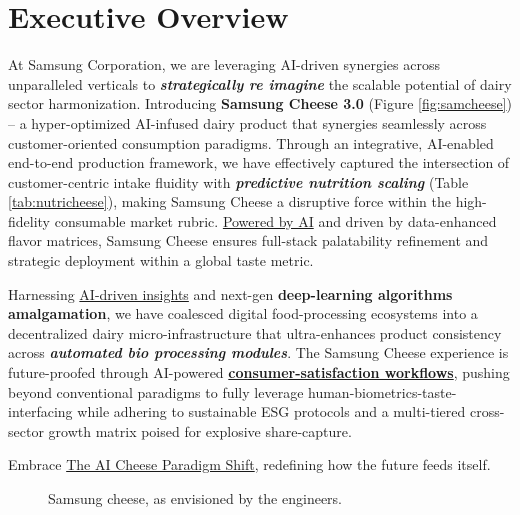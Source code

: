 \section*{Executive Overview}
At Samsung Corporation, we are leveraging AI-driven synergies across unparalleled verticals to \textit{\textbf{strategically re imagine}} the scalable potential of dairy sector harmonization. Introducing \textbf{Samsung Cheese 3.0} (Figure \ref{fig:samcheese}) – a hyper-optimized AI-infused dairy product that synergies seamlessly across customer-oriented consumption paradigms. Through an integrative, AI-enabled end-to-end production framework, we have effectively captured the intersection of customer-centric intake fluidity with \textit{\textbf{predictive nutrition scaling}} (Table \ref{tab:nutricheese}), making Samsung Cheese a disruptive force within the high-fidelity consumable market rubric. \underline{Powered by AI} and driven by data-enhanced flavor matrices, \textit{}{Samsung Cheese} ensures full-stack palatability refinement and strategic deployment within a global taste metric.

Harnessing \underline{AI-driven insights} and next-gen \textbf{deep-learning algorithms amalgamation}, we have coalesced digital food-processing ecosystems into a decentralized dairy micro-infrastructure that ultra-enhances product consistency across \textit{\textbf{automated bio processing modules}}. The Samsung Cheese experience is future-proofed through AI-powered \textbf{\underline{consumer-satisfaction workflows}}, pushing beyond conventional paradigms to fully leverage human-biometrics-taste-interfacing while adhering to sustainable ESG protocols and a multi-tiered cross-sector growth matrix poised for explosive share-capture.  

Embrace \underline{The AI Cheese Paradigm Shift}, redefining how the future feeds itself.

\begin{figure}[htbp] 
    \centering
 

   \caption{Samsung cheese, as envisioned by the engineers.}

\end{figure}
 